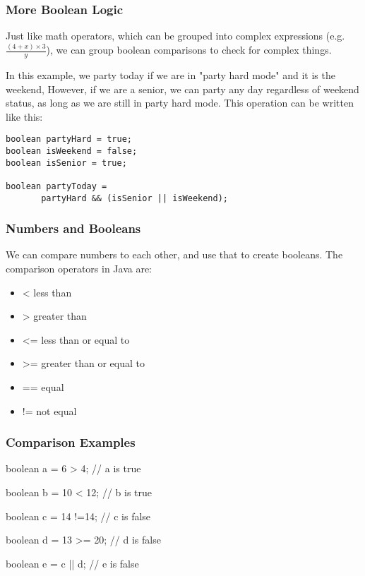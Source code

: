 \documentclass{beamer}
\begin{document}
\begin{frame}[fragile]
\frametitle{More Boolean Logic}
Just like math operators, which can be grouped into complex expressions (e.g. $\frac{\left(4+x\right)\times{3}}{y}$), we can group boolean comparisons to check for complex things.

\pause
In this example, we party today if we are in "party hard mode" and it is the weekend, However, if we are a senior, we can party any day regardless of weekend status, as long as we are still in party hard mode. This operation can be written like this:
\pause
\begin{lstlisting}
boolean partyHard = true;
boolean isWeekend = false;
boolean isSenior = true;

boolean partyToday =
       partyHard && (isSenior || isWeekend);
\end{lstlisting}
\end{frame}

\begin{frame}
\frametitle{Numbers and Booleans}
We can compare numbers to each other, and use that to create booleans. The comparison operators in Java are:
\begin{itemize}
\item<1->< less than
\item<2->> greater than
\item<3-><= less than or equal to
\item<4->>= greater than or equal to
\item<5->== equal
\item<6->!= not equal
\end{itemize}
\end{frame}

\begin{frame}
\frametitle{Comparison Examples}
boolean a = 6 > 4; \pause // a is true
\pause

boolean b = 10 < 12; \pause // b is true
\pause

boolean c = 14 !=14; \pause // c is false
\pause

boolean d = 13 >= 20; \pause // d is false
\pause

boolean e = c || d; \pause // e is false
\end{frame}
\end{document}
